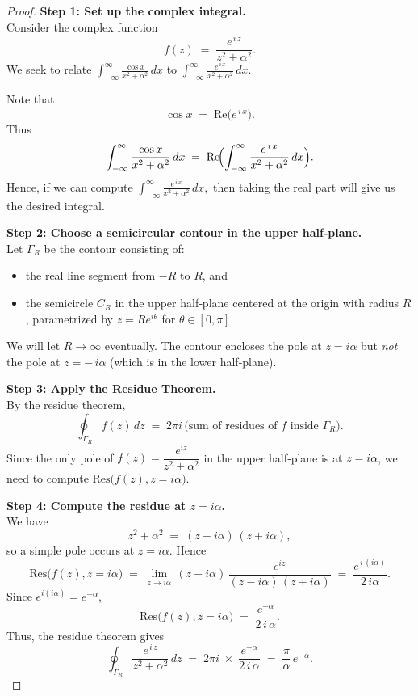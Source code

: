 \documentclass[12pt]{article}
\theoremstyle{definition} %
\theoremstyle{plain} %
\begin{document}
\begin{proof}
\textbf{Step 1: Set up the complex integral.}\\
Consider the complex function
\[
f(z)
\;=\;
\frac{e^{\,i\,z}}{z^2 + \alpha^2}.
\]
We seek to relate
\(\displaystyle \int_{-\infty}^{\infty} \frac{\cos x}{x^2+\alpha^2}\,dx\)
to
\(\displaystyle \int_{-\infty}^{\infty} \frac{e^{\,i\,x}}{x^2+\alpha^2}\,dx.\)

Note that
\[
\cos x \;=\;\mathrm{Re}\bigl(e^{\,i\,x}\bigr).
\]
Thus
\[
\int_{-\infty}^\infty \frac{\cos x}{x^2 + \alpha^2}\,dx
\;=\;
\mathrm{Re}\!
\Bigl(
\int_{-\infty}^\infty \frac{e^{\,i\,x}}{x^2 + \alpha^2}\,dx
\Bigr).
\]
Hence, if we can compute 
\(\int_{-\infty}^\infty \frac{e^{\,i\,x}}{x^2 + \alpha^2}\,dx,\)
then taking the real part will give us the desired integral.

\bigskip
\noindent
\textbf{Step 2: Choose a semicircular contour in the upper half‐plane.}\\
Let $\Gamma_R$ be the contour consisting of:
\begin{itemize}
\item the real line segment from $-R$ to $R$, and
\item the semicircle $C_R$ in the upper half‐plane centered at the origin with radius $R$, parametrized by $z = Re^{i\theta}$ for $\theta\in [0,\pi]$.
\end{itemize}
We will let $R \to \infty$ eventually. The contour encloses the pole at $z=i\alpha$ but \emph{not} the pole at $z=-\,i\alpha$ (which is in the lower half‐plane).

\bigskip
\noindent
\textbf{Step 3: Apply the Residue Theorem.}\\
By the residue theorem,
\[
\oint_{\Gamma_R} f(z)\,dz
\;=\;
2\pi i\,\bigl(\text{sum of residues of }f\text{ inside }\Gamma_R\bigr).
\]
Since the only pole of $f(z)=\dfrac{e^{iz}}{z^2+\alpha^2}$ in the upper half‐plane is at $z=i\alpha$, we need to compute $\mathrm{Res}\bigl(f(z), z=i\alpha\bigr).$

\bigskip
\noindent
\textbf{Step 4: Compute the residue at $z=i\alpha$.}\\
We have
\[
z^2 + \alpha^2
\;=\;
(z - i\alpha)\,(z + i\alpha),
\]
so a simple pole occurs at $z=i\alpha$. Hence
\[
\mathrm{Res}\bigl(f(z), z=i\alpha\bigr)
\;=\;
\lim_{z\to i\alpha}\,(z - i\alpha)\,\frac{e^{i z}}{(z - i\alpha)\,(z + i\alpha)}
\;=\;
\frac{e^{\,i\,(i\alpha)}}{2\,i\alpha}.
\]
Since $e^{i(i\alpha)}=e^{-\alpha}$,
\[
\mathrm{Res}\bigl(f(z), z=i\alpha\bigr)
\;=\;
\frac{e^{-\alpha}}{2\,i\,\alpha}.
\]
Thus, the residue theorem gives
\[
\oint_{\Gamma_R} \frac{e^{\,i\,z}}{z^2 + \alpha^2}\,dz
\;=\;
2\pi i 
\;\times\;
\frac{\,e^{-\alpha}\,}{2\,i\,\alpha}
\;=\;
\frac{\pi}{\alpha}\,e^{-\alpha}.
\]


\end{proof}
\end{document}
